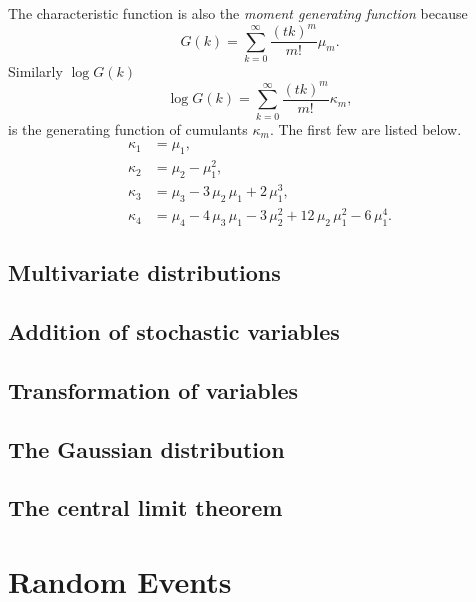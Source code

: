 \documentclass{book}
\numberwithin{equation}{section}
\theoremstyle{plain}
\theoremstyle{definition}
\theoremstyle{remark}
\begin{document}
The characteristic function is also the \emph{moment generating function}
because
\begin{equation}
  G(k) = \sum_{k = 0}^\infty \frac{(tk)^m } {m!} \mu_m.
  \label{eq:mugen}
\end{equation}
Similarly $\log G(k)$
\begin{equation}
  \log G(k) = \sum_{k = 0}^\infty \frac{(tk)^m } {m!} \kappa_m,
  \label{eq:kappagen}
\end{equation}
is the generating function of cumulants $\kappa_m$.
The first few are listed below.
\begin{equation}
  \begin{aligned}
    \kappa_1 &= \mu_1, \\
    \kappa_2 &= \mu_2 - \mu_1^2, \\
    \kappa_3 &= \mu_3 -3 \, \mu_2 \, \mu_1 + 2 \, \mu_1^3, \\
    \kappa_4 &= \mu_4 -4 \, \mu_3 \, \mu_1 - 3 \, \mu_2^2 + 12 \, \mu_2 \, \mu_1^2 - 6 \, \mu_1^4.
  \end{aligned}
\end{equation}


\section{Multivariate distributions}

\section{Addition of stochastic variables}

\section{Transformation of variables}

\section{The Gaussian distribution}

\section{The central limit theorem}




\chapter{Random Events}
\end{document}
